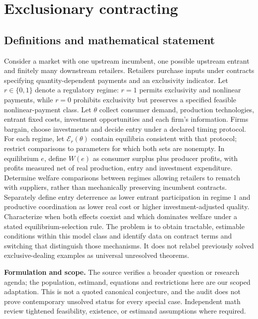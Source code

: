 \documentclass[11pt]{article}
\begin{document}
\section*{Exclusionary contracting}\label{30007681}
\subsection{Definitions and mathematical statement}
Consider a market with one upstream incumbent, one possible upstream entrant and finitely many downstream retailers. Retailers purchase inputs under contracts specifying quantity-dependent payments and an exclusivity indicator. Let \(r\in\{0,1\}\) denote a regulatory regime: \(r=1\) permits exclusivity and nonlinear payments, while \(r=0\) prohibits exclusivity but preserves a specified feasible nonlinear-payment class. Let \(\theta\) collect consumer demand, production technologies, entrant fixed costs, investment opportunities and each firm's information. Firms bargain, choose investments and decide entry under a declared timing protocol. For each regime, let \(\mathcal E_r(\theta)\) contain equilibria consistent with that protocol; restrict comparisons to parameters for which both sets are nonempty. In equilibrium \(e\), define \(W(e)\) as consumer surplus plus producer profits, with profits measured net of real production, entry and investment expenditure. Determine welfare comparisons between regimes allowing retailers to rematch with suppliers, rather than mechanically preserving incumbent contracts. Separately define entry deterrence as lower entrant participation in regime \(1\) and productive coordination as lower real cost or higher investment-adjusted quality. Characterize when both effects coexist and which dominates welfare under a stated equilibrium-selection rule. The problem is to obtain tractable, estimable conditions within this model class and identify data on contract terms and switching that distinguish those mechanisms. It does not relabel previously solved exclusive-dealing examples as universal unresolved theorems.

\par\textbf{Formulation and scope.} The source verifies a broader question or research agenda; the population, estimand, equations and restrictions here are our scoped adaptation. This is not a quoted canonical conjecture, and the audit does not prove contemporary unsolved status for every special case. Independent math review tightened feasibility, existence, or estimand assumptions where required.
\end{document}
